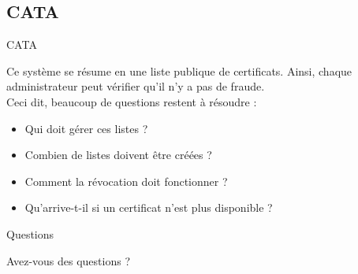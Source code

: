 \documentclass{bredelebeamer}
\begin{document}
\subsection{CATA}

\begin{frame}{CATA}

	Ce système se résume en une liste publique de certificats. Ainsi, chaque administrateur peut vérifier qu'il n'y a pas de fraude.\\
	Ceci dit, beaucoup de questions restent à résoudre :
	\begin{itemize}
		\item Qui doit gérer ces listes ?
		\item Combien de listes doivent être créées ?
		\item Comment la révocation doit fonctionner ?
		\item Qu'arrive-t-il si un certificat n'est plus disponible ?
	\end{itemize}
	
\end{frame}

\begin{frame}{Questions}
\begin{center}
	Avez-vous des questions ?
\end{center}


\end{frame}
\end{document}
